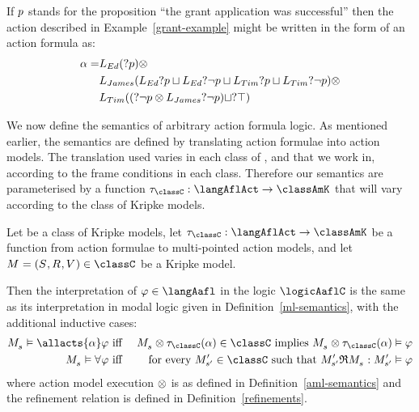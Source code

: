 \begin{example}\label{grant-example-formula}
If $p$ stands for the proposition ``the grant application was successful'' then the action described in Example~\ref{grant-example} might be written in the form of an action formula as:
\begin{align*}
    \alpha = &L_{Ed} (?{p}) \otimes\\
    &L_{James} (L_{Ed} ?{p} \sqcup L_{Ed} ?{\neg p} \sqcup L_{Tim} ?{p} \sqcup L_{Tim} ?{\neg p}) \otimes\\
    &L_{Tim} ((?{\neg p} \otimes L_{James} ?{\neg p}) \sqcup ?{\top})
\end{align*}
\end{example}

We now define the semantics of arbitrary action formula logic.
As mentioned earlier, the semantics are defined by translating action formulae into action models.
The translation used varies in each class of \classK{}, \classKFF{} and \classS{} that we work in, according to the frame conditions in each class.
Therefore our semantics are parameterised by a function $\tau_\classC: \langAflAct \to \classAmK$ that will vary according to the class of Kripke models.

\begin{definition}
Let \classC{} be a class of Kripke models, let $\tau_\classC : \langAflAct \to \classAmK$ be a function from action formulae to multi-pointed action models, and let $\kModel = \kModelTuple \in \classC$ be a Kripke model.

Then the interpretation of $\phi \in \langAafl$ in the logic $\logicAaflC$ is the same as its interpretation in modal logic given in Definition~\ref{ml-semantics}, with the additional inductive cases:
\begin{eqnarray*}
    \kPModel{\kStateS} \entails \allacts{\alpha} \phi &\text{ iff }& \kPModel{\kStateS} \exec \tau_\classC(\alpha) \in \classC \text{ implies } \kPModel{\kStateS} \exec \tau_\classC(\alpha) \entails \phi\\
    \kPModel{\kStateS} \entails \allrefs \phi &\text{ iff }& \text{for every } \kPModel[\prime]{\kStateS[\prime]} \in \classC \text{ such that } \kPModel[\prime]{\kStateS[\prime]} \refinement \kPModel{\kStateS}: \kPModel[\prime]{\kStateS[\prime]} \entails \phi
\end{eqnarray*}
where action model execution $\otimes$ is as defined in Definition~\ref{aml-semantics} and the refinement relation is defined in Definition~\ref{refinements}.
\end{definition}

